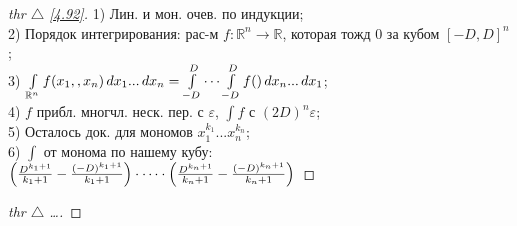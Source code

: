 \begin{minipage}[]{0.49\textwidth}
\begin{proof}[
thr $\triangle$
\eqref{4.92}]

\phantom{42}
\noindent

1) Лин. и мон. очев. по индукции;\\
2) Порядок интегрирования: рас-м $f \colon \mathbb{R}^n \to \mathbb{R}$, которая тожд 0 за кубом $[-D, D]^n$;\\
3) $\int\limits_{\mathbb{R}^n} f(x_1,, x_n) \, d x_1 ... \, d x_n = \int\limits_{-D}^D \cdots \int\limits_{-D}^D f() \, d x_n ... \, d x_1$;\\
4) $f$ прибл. многчл. неск. пер. с $\varepsilon$, $\int f$ с $(2 D)^n \varepsilon$;\\
5) Осталось док. для мономов $x_1^{k_1}...x_n^{k_n}$;\\
6) $\int$ от монома по нашему кубу:\\
$\left(\frac{D^{k_1 + 1}}{k_1 + 1} - \frac{(- D)^{k_1 +1}}{k_1 + 1}\right) \cdot \cdots \cdot \left(\frac{D^{k_n + 1}}{k_n + 1} - \frac{(- D)^{k_n +1}}{k_n + 1}\right)$

\end{proof}
\end{minipage}
\hfill
\begin{minipage}[]{0.45\textwidth}
\begin{proof}[
 thr $\triangle$
\dots]

\phantom{42}
\noindent

\end{proof}
\end{minipage}